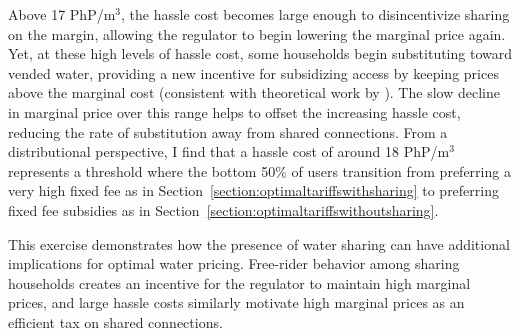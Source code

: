 \documentclass[12pt]{article}
\begin{document}
Above 17 PhP/$\text{m}^3$, the hassle cost becomes large enough to disincentivize sharing on the margin, allowing the regulator to begin lowering the marginal price again.  Yet, at these high levels of hassle cost, some households begin substituting toward vended water, providing a new incentive for subsidizing access by keeping prices above the marginal cost (consistent with theoretical work by \cite{auerbach1978two}).  The slow decline in marginal price over this range helps to offset the increasing hassle cost, reducing the rate of substitution away from shared connections.  From a distributional perspective, I find that a hassle cost of around 18 PhP/$\text{m}^3$ represents a threshold where the bottom 50\% of users transition from preferring a very high fixed fee as in Section~\ref{section:optimaltariffswithsharing} to preferring fixed fee subsidies as in Section~\ref{section:optimaltariffswithoutsharing}.  

This exercise demonstrates how the presence of water sharing can have additional implications for optimal water pricing.  Free-rider behavior among sharing households creates an incentive for the regulator to maintain high marginal prices, and large hassle costs similarly motivate high marginal prices as an efficient tax on shared connections.
\end{document}
